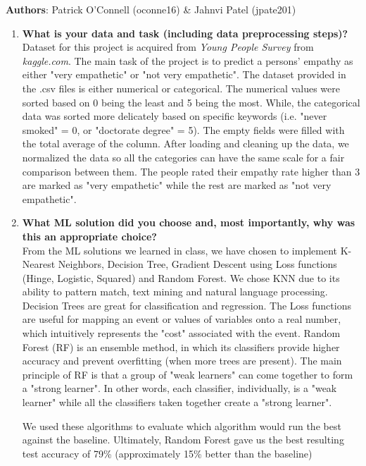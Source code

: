 \documentclass[5px]{report}
\begin{document}
\textbf{Authors}: Patrick O'Connell (oconne16) \& Jahnvi Patel (jpate201)
\begin{enumerate}
\item \textbf{What is your data and task (including data preprocessing steps)?} \\
Dataset for this project is acquired from \textit{Young People Survey} from \textit{kaggle.com}. The main task of the project is to predict a persons' empathy as either "very empathetic" or "not very empathetic". The dataset provided in the .csv files is either numerical or categorical. The numerical values were sorted based on 0 being the least and 5 being the most. While, the categorical data was sorted more delicately based on specific keywords (i.e. "never smoked" = 0, or "doctorate degree" = 5). The empty fields were filled with the total average of the column. After loading and cleaning up the data, we normalized the data so all the categories can have the same scale for a fair comparison between them. The people rated their empathy rate higher than 3 are marked as "very empathetic" while the rest are marked as "not very empathetic".

\item \textbf{What ML solution did you choose and, most importantly, why was this an appropriate choice?}\\
From the ML solutions we learned in class, we have chosen to implement K-Nearest Neighbors, Decision Tree, Gradient Descent using Loss functions (Hinge, Logistic, Squared) and Random Forest. We chose KNN due to its ability to pattern match, text mining and natural language processing. Decision Trees are great for classification and regression. The Loss functions are useful for mapping an event or values of variables onto a real number, which intuitively represents the "cost" associated with the event. Random Forest (RF) is an ensemble method, in which its classifiers provide higher accuracy and prevent overfitting (when more trees are present). The main principle of RF is that a group of "weak learners" can come together to form a "strong learner". In other words, each classifier, individually, is a "weak learner" while all the classifiers taken together create a "strong learner".

We used these algorithms to evaluate which algorithm would run the best against the baseline. Ultimately, Random Forest gave us the best resulting test accuracy of 79\% (approximately 15\% better than the baseline)


\end{enumerate}
\end{document}
